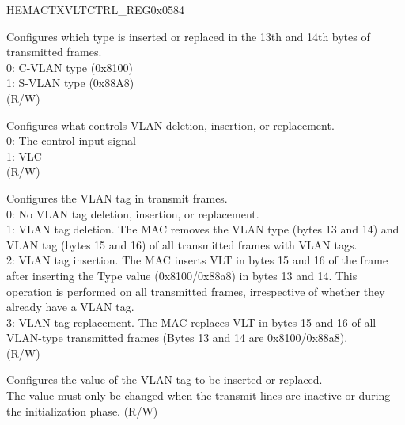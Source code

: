\begin{register}{H}{EMACTXVLTCTRL\_REG}{0x0584}\label{regdesc:EMACTXVLANTAGCONTROLREG}
%
%
%
%
%
\regnewline%
\begin{regdesc}\begin{reglist}
\item [CSVL] Configures which type is inserted or replaced in the 13th and 14th bytes of transmitted frames.\\
0: C-VLAN type (0x8100)\\
1: S-VLAN type (0x88A8)\\ (R/W)
\item [VLP] Configures what controls VLAN deletion, insertion, or replacement.\\
0: The control input signal\\
1: VLC\\ (R/W)
\item [VLC] Configures the VLAN tag in transmit frames.\\
0: No VLAN tag deletion, insertion, or replacement.\\
1: VLAN tag deletion. The MAC removes the VLAN type (bytes 13 and 14) and VLAN tag (bytes 15 and 16) of all transmitted frames with VLAN tags.\\
2: VLAN tag insertion. The MAC inserts VLT in bytes 15 and 16 of the frame after inserting the Type value (0x8100/0x88a8) in bytes 13 and 14. This operation is performed on all transmitted frames, irrespective of whether they already have a VLAN tag.\\
3: VLAN tag replacement. The MAC replaces VLT in bytes 15 and 16 of all VLAN-type transmitted frames (Bytes 13 and 14 are 0x8100/0x88a8). \\ (R/W)
\item [VLT] Configures the value of the VLAN tag to be inserted or replaced.\\
The value must only be changed when the transmit lines are inactive or during the initialization phase. (R/W)
\end{reglist}\end{regdesc}
\end{register}

